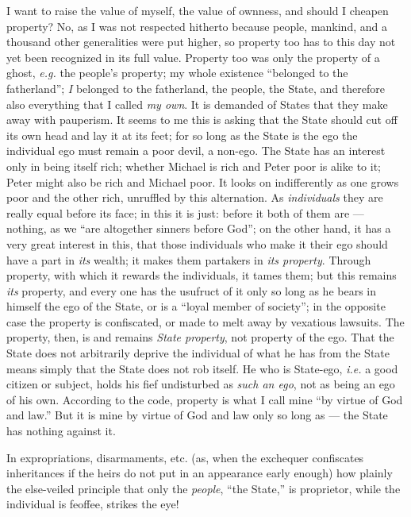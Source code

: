 I want to raise the value of myself, the value of ownness, and should I 
cheapen property? No, as I was not respected hitherto because people, mankind, 
and a thousand other generalities were put higher, so property too has to this 
day not yet been recognized in its full value. Property too was only the 
property of a ghost, \textit{e.g.} the people's property; my whole existence 
``belonged to the fatherland''; \textit{I} belonged to the fatherland, the 
people, the State, and therefore also everything that I called \textit{my 
own}. It is demanded of States that they make away with pauperism. It seems to 
me this is asking that the State should cut off its own head and lay it at its 
feet; for so long as the State is the ego the individual ego must remain a 
poor devil, a non-ego. The State has an interest only in being itself rich; 
whether Michael is rich and Peter poor is alike to it; Peter might also be 
rich and Michael poor. It looks on indifferently as one grows poor and the 
other rich, unruffled by this alternation. As \textit{individuals} they are 
really equal before its face; in this it is just: before it both of them are --- nothing, as we ``are altogether sinners before God''; on the other hand, 
it has a very great interest in this, that those individuals who make it their 
ego should have a part in \textit{its} wealth; it makes them partakers in 
\textit{its property}. Through property, with which it rewards the 
individuals, it tames them; but this remains \textit{its} property, and every 
one has the usufruct of it only so long as he bears in himself the ego of the 
State, or is a ``loyal member of society''; in the opposite case the 
property is confiscated, or made to melt away by vexatious lawsuits. The 
property, then, is and remains \textit{State property}, not property of the 
ego. That the State does not arbitrarily deprive the individual of what he has 
from the State means simply that the State does not rob itself. He who is 
State-ego, \textit{i.e.} a good citizen or subject, holds his fief undisturbed 
as \textit{such an ego}, not as being an ego of his own. According to the 
code, property is what I call mine ``by virtue of God and law.'' But it is 
mine by virtue of God and law only so long as --- the State has nothing against 
it.

In expropriations, disarmaments, etc. (as, when the exchequer confiscates 
inheritances if the heirs do not put in an appearance early enough) how 
plainly the else-veiled principle that only the \textit{people}, ``the 
State,'' is proprietor, while the individual is feoffee, strikes the eye!

